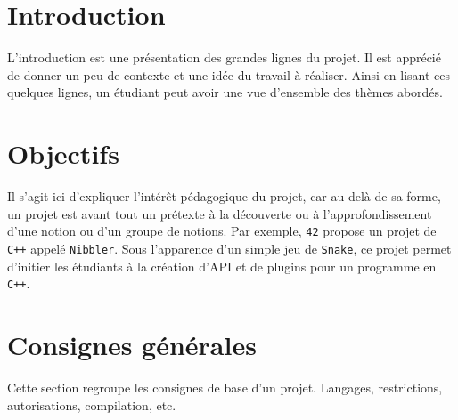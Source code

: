 \documentclass{42-fr}
\begin{document}
\chapter{Introduction}

    L'introduction est une pr\'esentation des grandes lignes du
    projet. Il est appr\'eci\'e de donner un peu de contexte et une
    id\'ee du travail \`a r\'ealiser. Ainsi en lisant ces quelques
    lignes, un \'etudiant peut avoir une vue d'ensemble des th\`emes
    abord\'es.



\chapter{Objectifs}

    Il s'agit ici d'expliquer l'int\'er\^et p\'edagogique du projet,
    car au-del\`a de sa forme, un projet est avant tout un
    pr\'etexte \`a la d\'ecouverte ou \`a l'approfondissement d'une
    notion ou d'un groupe de notions. Par exemple, \texttt{42} propose
    un projet de \texttt{C++} appel\'e \texttt{Nibbler}. Sous
    l'apparence d'un simple jeu de \texttt{Snake}, ce projet permet
    d'initier les \'etudiants \`a la cr\'eation d'API et de plugins
    pour un programme en \texttt{C++}.



\chapter{Consignes g\'en\'erales}

    Cette section regroupe les consignes de base d'un
    projet. Langages, restrictions, autorisations, compilation, etc.
\end{document}
